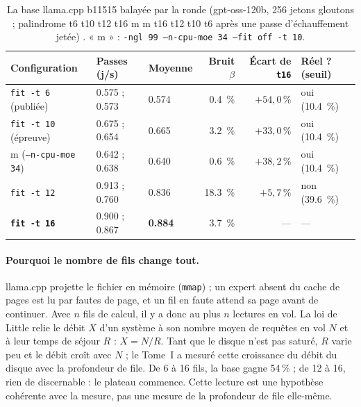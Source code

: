\begin{table}[ht]
\centering\small
\caption[La base llama.cpp balayée]{La base llama.cpp b11515 balayée par la ronde (gpt-oss-120b, 256 jetons gloutons ; palindrome t6 t10 t12 t16 m m t16 t12 t10 t6 après une passe d'échauffement jetée) \mes. « m » : \texttt{-ngl 99 --n-cpu-moe 34 --fit off -t 10}.}
\label{t2res-tab:base}
\begin{tabular}{@{}lllrrl@{}}
\toprule
Configuration & Passes (j/s) & Moyenne & Bruit $\beta$ & Écart de \texttt{t16} & Réel ? (seuil) \\
\midrule
\texttt{fit -t 6} (publiée) & \num{0.575} ; \num{0.573} & \num{0.574} & \SI{0.4}{\percent} & $+54{,}0\,\%$ & oui (\SI{10.4}{\percent}) \\
\texttt{fit -t 10} (épreuve) & \num{0.675} ; \num{0.654} & \num{0.665} & \SI{3.2}{\percent} & $+33{,}0\,\%$ & oui (\SI{10.4}{\percent}) \\
m (\texttt{--n-cpu-moe 34}) & \num{0.642} ; \num{0.638} & \num{0.640} & \SI{0.6}{\percent} & $+38{,}2\,\%$ & oui (\SI{10.4}{\percent}) \\
\texttt{fit -t 12} & \num{0.913} ; \num{0.760} & \num{0.836} & \SI{18.3}{\percent} & $+5{,}7\,\%$ & non (\SI{39.6}{\percent}) \\
\textbf{\mbox{\texttt{fit -t 16}}} & \num{0.900} ; \num{0.867} & \textbf{\num{0.884}} & \SI{3.7}{\percent} & --- & --- \\
\bottomrule
\end{tabular}
\end{table}

\paragraph{Pourquoi le nombre de fils change tout.} llama.cpp projette le fichier en mémoire (\texttt{mmap}) ; un expert absent du cache de pages est lu par fautes de page, et un fil en faute attend sa page avant de continuer. Avec $n$ fils de calcul, il y a donc au plus $n$ lectures en vol. La loi de Little \cite{little1961} relie le débit $X$ d'un système à son nombre moyen de requêtes en vol $N$ et à leur temps de séjour $R$ : $X = N/R$. Tant que le disque n'est pas saturé, $R$ varie peu et le débit croît avec $N$ ; le Tome~I a mesuré cette croissance du débit du disque avec la profondeur de file. De 6 à 16 fils, la base gagne \num{54}\,\% ; de 12 à 16, rien de discernable : le plateau commence. Cette lecture est une hypothèse cohérente avec la mesure, pas une mesure de la profondeur de file elle-même.

